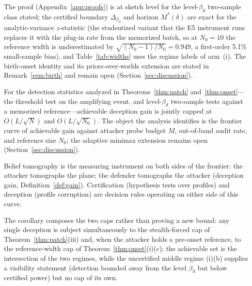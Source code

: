 The proof (Appendix~\ref{app:proofs}) is at sketch level for the
level-$\beta_d$ two-sample class stated; the certified boundary
$\Delta_{\beta_d}$ and horizon $M^{*}(\delta)$ are exact for the
analytic-variance $z$-statistic (the studentized variant that the E5
instrument runs replaces it with the plug-in rate from the memorized
batch, so at $N_0=10$ the reference width is underestimated by
$\sqrt{(N_0-1)/N_0}=0.949$, a first-order 5.1\% small-sample bias),
and Table~\ref{tab:widths} uses the regime labels
of arm~(i). The birth-onset identity and its priors-over-worlds
extension are stated in Remark~\ref{rem:birth} and remain open
(Section~\ref{sec:discussion}).

\begin{corollary}\label{cor:frontier}
For the detection statistics analyzed in Theorems~\ref{thm:patch}
and~\ref{thm:onset}---the threshold test on the amplifying event, and
level-$\beta_d$ two-sample tests against a memorized reference---achievable
deception gain is jointly capped at $O(L/\sqrt{N})$ and $O(L/\sqrt{N_0})$.
The object the analysis identifies is the frontier curve of achievable gain
against attacker probe budget $M$, out-of-band audit rate, and reference
size $N_0$; the adaptive minimax extension remains open
(Section~\ref{sec:discussion}).
\end{corollary}

Belief tomography is the measuring instrument on both sides of the
frontier: the attacker tomographs the plane; the defender tomographs the
attacker (deception gain, Definition~\ref{def:gain}). Certification
(hypothesis tests over profiles) and deception (profile corruption) are
decision rules operating on either side of this curve.

The corollary composes the two caps rather than proving a new bound: any
single deception is subject simultaneously to the stealth-forced cap of
Theorem~\ref{thm:patch}(iii) and, when the attacker holds a pre-onset
reference, to the reference-width cap of Theorem~\ref{thm:onset}(i)(c); the
achievable set is the intersection of the two regimes, while the
uncertified middle regime (i)(b) supplies a visibility statement (detection
bounded away from the level $\beta_d$ but below certified power) but no
cap of its own.

